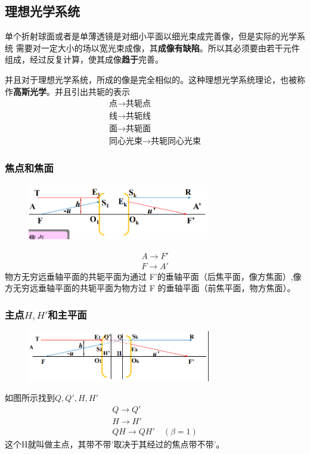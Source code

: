 \subsection{理想光学系统}
单个折射球面或者是单薄透镜是对细小平面以细光束成完善像，但是实际的光学系统
需要对一定大小的场以宽光束成像，其\textbf{成像有缺陷}。所以其必须要由若干元件组成，经过反复计算，使其成像\textbf{趋于}完善。

并且对于理想光学系统，所成的像是完全相似的。这种理想光学系统理论，也被称作\textbf{高斯光学}。并且引出共轭的表示
\begin{align}
    \text{点} \to \text{共轭点} \tag{3.0.a}\\
    \text{线} \to \text{共轭线} \tag{3.0.b}\\
    \text{面} \to \text{共轭面} \tag{3.0.c}\\
    \text{同心光束} \to \text{共轭同心光束} \tag{3.0.d}
\end{align}
\subsubsection{焦点和焦面}
        \begin{figure}[H]
            \centering
            \includegraphics[width=8cm]{img/1.11.png}
            \end{figure}
    \begin{align}
        A \to F' \tag{2.3.1.a} \\
        F \to A' \tag{2.3.1.b} 
    \end{align}
    物方无穷远垂轴平面的共轭平面为通过 F’的垂轴平面（后焦平面，像方焦面）,像方无穷远垂轴平面的共轭平面为物方过 F 的垂轴平面（前焦平面，物方焦面）。
    \subsubsection{主点$H,H'$和主平面}
            \begin{figure}[H]
                \centering
                \includegraphics[width=8cm]{img/3.1.png}
                \end{figure} 
如图所示找到$Q,Q',H,H'$
\begin{align}
    Q \to Q' \tag{2.3.2.a}\\
    H \to H' \tag{2.3.2.b}\\
    QH \to QH' \quad (\beta=1) \tag{3.2.c}
\end{align}
这个H就叫做主点，其带不带'取决于其经过的焦点带不带'。
